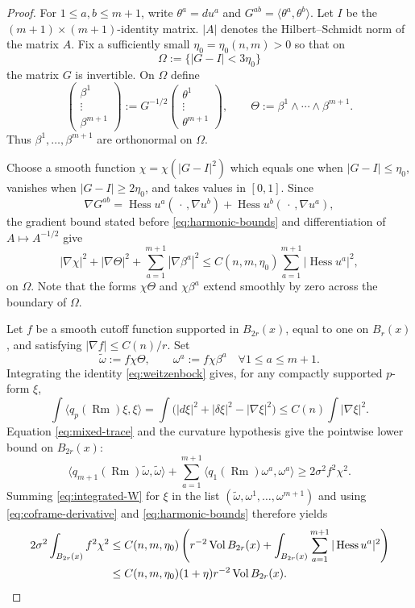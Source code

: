 \documentclass[11pt]{amsart}
\theoremstyle{definition}
\theoremstyle{remark}
\DeclareMathOperator{\Hess}{Hess}
\DeclareMathOperator{\Vol}{Vol}
\newcommand{\Rm}{\operatorname{Rm}}
\begin{document}
\begin{proof}
For $1\leq a,b\leq m+1$, write $\theta^a=du^a$ and
$G^{ab}=\langle\theta^a,\theta^b\rangle$. Let $I$ be the $(m+1)\times (m+1)$-identity matrix. $|A|$ denotes the Hilbert--Schmidt norm of the matrix $A$. Fix a sufficiently small
$\eta_0=\eta_0(n,m)>0$ so that on
\[
                   \Omega:=\{|G-I|<3\eta_0\}
\]
the matrix $G$ is invertible. On $\Omega$ define
\[
 \begin{pmatrix}\beta^1\\ \vdots\\ \beta^{m+1}\end{pmatrix}
       :=G^{-1/2}
         \begin{pmatrix}\theta^1\\ \vdots\\ \theta^{m+1}\end{pmatrix},
 \qquad
                   \Theta:=\beta^1\wedge\cdots\wedge\beta^{m+1}.
\]
Thus $\beta^1,\ldots,\beta^{m+1}$ are orthonormal on $\Omega$.

Choose a smooth function $\chi=\chi(|G-I|^2)$ which equals one when
$|G-I|\leq\eta_0$, vanishes when $|G-I|\geq2\eta_0$, and takes values
in $[0,1]$.  Since
\[
 \nabla G^{ab}
 =\Hess u^a(\,\cdot\,,\nabla u^b)
  +\Hess u^b(\,\cdot\,,\nabla u^a),
\]
the gradient bound stated before \eqref{eq:harmonic-bounds} and differentiation
of $A\mapsto A^{-1/2}$ give
\begin{equation}\label{eq:coframe-derivative}
 |\nabla\chi|^2+|\nabla\Theta|^2
       +\sum_{a=1}^{m+1}|\nabla\beta^a|^2
 \leq C(n,m,\eta_0)\sum_{a=1}^{m+1}|\Hess u^a|^2,
\end{equation}
on $\Omega$.  Note that the forms $\chi\Theta$ and $\chi\beta^a$ extend
smoothly by zero across the boundary of $\Omega$.

Let $f$ be a smooth cutoff function supported in $B_{2r}(x)$, equal to one
on $B_r(x)$, and satisfying $|\nabla f|\leq C(n)/r$.  Set
\[
        \widetilde\omega:=f\chi\Theta,
        \qquad \omega^a:=f\chi\beta^a\quad \forall 1\leq a\leq m+1.
\]
Integrating the identity \eqref{eq:weitzenbock} gives, for any compactly
supported $p$-form $\xi$,
\begin{equation}\label{eq:integrated-W}
 \int\langle q_p(\Rm)\xi,\xi\rangle
 =\int\bigl(|d\xi|^2+|\delta\xi|^2-|\nabla\xi|^2\bigr)
 \leq C(n)\int|\nabla\xi|^2.
\end{equation}
Equation \eqref{eq:mixed-trace} and the
curvature hypothesis give the pointwise lower bound on $B_{2r}(x)$:
\[
 \langle q_{m+1}(\Rm)\widetilde\omega,\widetilde\omega\rangle
 +\sum_{a=1}^{m+1}\langle q_1(\Rm)\omega^a,\omega^a\rangle
 \geq 2\sigma^2 f^2\chi^2.
\]
Summing \eqref{eq:integrated-W} for $\xi$ in the list $(\widetilde\omega,\omega^1,\ldots,\omega^{m+1})$ and using
\eqref{eq:coframe-derivative} and \eqref{eq:harmonic-bounds} therefore yields
\begin{align}
 2\sigma^2\int_{B_{2r}(x)}f^2\chi^2
 &\leq C(n,m,\eta_0)
 \left(r^{-2}\Vol B_{2r}(x)
       +\int_{B_{2r}(x)}\sum_{a=1}^{m+1}|\Hess u^a|^2\right) \notag\\
 &\leq C(n,m,\eta_0)(1+\eta)r^{-2}\Vol B_{2r}(x).
 \label{eq:hodge-upper}
\end{align}


\end{proof}
\end{document}
